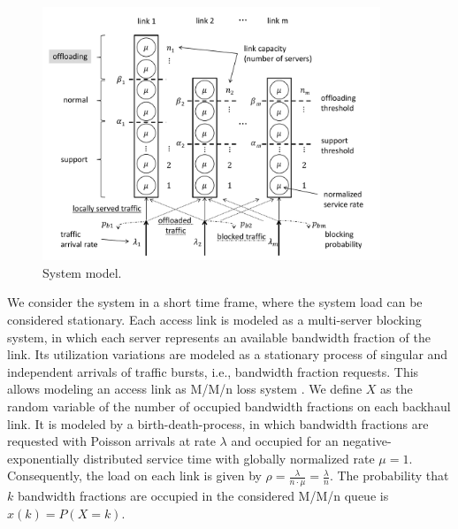 \begin{figure}[tb]
	\centering
 	\includegraphics[width=0.9\textwidth]{aggregation/performance_model/figures/model_m}
  	\caption{System model.}
  	\label{fig:aggr:sysmodel}
\end{figure}


We consider the system in a short time frame, where the system load can be considered stationary.
Each access link is modeled as a multi-server blocking system, in which each server represents an available bandwidth fraction of the link.
Its utilization variations are modeled as a stationary process of singular and independent arrivals of traffic bursts, i.e., bandwidth fraction requests. This allows modeling an access link as M/M/n loss system \cite{kleinrock1975queuing}. We define $X$ as the random variable of the number of occupied bandwidth fractions on each backhaul link. It is modeled by a birth-death-process, in which bandwidth fractions are requested with Poisson arrivals at rate $\lambda$ and occupied for an negative-exponentially distributed service time with globally normalized rate $\mu=1$. Consequently, the load on each link is given by $\rho=\frac{\lambda}{n\cdot \mu}=\frac{\lambda}{n}$. The probability that $k$ bandwidth fractions are occupied in the considered M/M/n queue is $x(k)=P(X=k)$.

